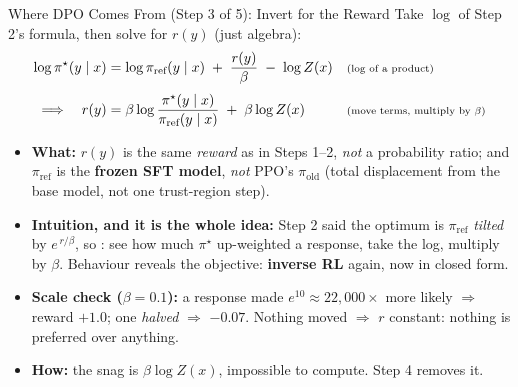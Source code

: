 \begin{frame}{Where DPO Comes From (Step 3 of 5): Invert for the Reward}
Take $\log$ of Step 2's formula, then solve for $r(y)$ (just algebra):
\begin{align*}
    \log\pi^\star(y\mid x)
        &= \log\pi_{\text{ref}}(y\mid x) \;+\; \frac{r(y)}{\beta} \;-\; \log Z(x)
        && \text{\scriptsize($\log$ of a product)}\\[0.3em]
    \Longrightarrow\quad
    r(y) &= \beta\log\frac{\pi^\star(y\mid x)}{\pi_{\text{ref}}(y\mid x)}
        \;+\; \beta\log Z(x)
        && \text{\scriptsize(move terms, multiply by $\beta$)}
\end{align*}
\begin{itemize}\itemsep0.15em\small
    \item \textbf{What:} $r(y)$ is the same \emph{reward} as in Steps 1--2, \emph{not}
          a probability ratio; and $\pi_{\text{ref}}$ is the \textbf{frozen SFT
          model}, \emph{not} PPO's $\pi_{\text{old}}$ (total displacement from the
          base model, not one trust-region step).
    \item \textbf{Intuition, and it is the whole idea:} Step 2 said the optimum is
          $\pi_{\text{ref}}$ \emph{tilted} by $e^{\,r/\beta}$, so : see how much $\pi^\star$ up-weighted a response, take the log,
          multiply by $\beta$. Behaviour reveals the objective: \textbf{inverse RL}
          again, now in closed form.
    \item \textbf{Scale check ($\beta=0.1$):} a response made $e^{10}\!\approx\!
          22{,}000\times$ more likely $\Rightarrow$ reward $+1.0$; one \emph{halved}
          $\Rightarrow$ $-0.07$. Nothing moved $\Rightarrow$ $r$ constant: nothing is
          preferred over anything.
    \item \textbf{How:} the snag is $\beta\log Z(x)$, impossible to compute. Step 4
          removes it.
\end{itemize}
\end{frame}

